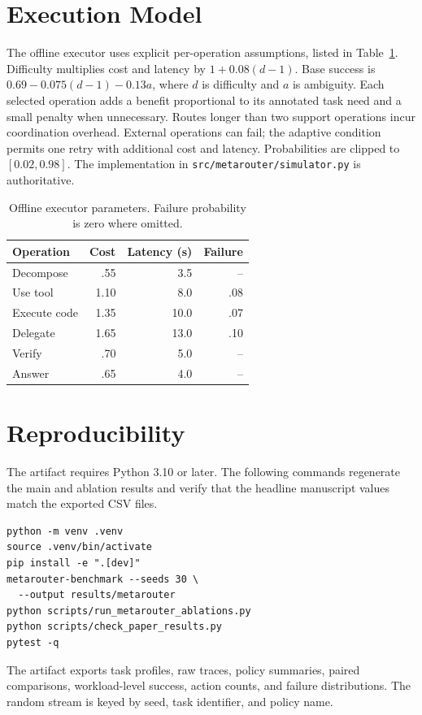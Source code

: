 \documentclass[sigconf]{acmart}
\begin{document}



\appendix

\section{Execution Model}

The offline executor uses explicit per-operation assumptions, listed in Table~\ref{tab:parameters}. Difficulty multiplies cost and latency by $1+0.08(d-1)$. Base success is $0.69-0.075(d-1)-0.13a$, where $d$ is difficulty and $a$ is ambiguity. Each selected operation adds a benefit proportional to its annotated task need and a small penalty when unnecessary. Routes longer than two support operations incur coordination overhead. External operations can fail; the adaptive condition permits one retry with additional cost and latency. Probabilities are clipped to $[0.02,0.98]$. The implementation in \texttt{src/metarouter/simulator.py} is authoritative.

\begin{table}[h]
\caption{Offline executor parameters. Failure probability is zero where omitted.}
\label{tab:parameters}
\small
\begin{tabular}{lrrr}
\toprule
Operation & Cost & Latency (s) & Failure \\
\midrule
Decompose & .55 & 3.5 & -- \\
Use tool & 1.10 & 8.0 & .08 \\
Execute code & 1.35 & 10.0 & .07 \\
Delegate & 1.65 & 13.0 & .10 \\
Verify & .70 & 5.0 & -- \\
Answer & .65 & 4.0 & -- \\
\bottomrule
\end{tabular}
\end{table}

\section{Reproducibility}

The artifact requires Python 3.10 or later. The following commands regenerate the main and ablation results and verify that the headline manuscript values match the exported CSV files.

\begin{verbatim}
python -m venv .venv
source .venv/bin/activate
pip install -e ".[dev]"
metarouter-benchmark --seeds 30 \
  --output results/metarouter
python scripts/run_metarouter_ablations.py
python scripts/check_paper_results.py
pytest -q
\end{verbatim}

The artifact exports task profiles, raw traces, policy summaries, paired comparisons, workload-level success, action counts, and failure distributions. The random stream is keyed by seed, task identifier, and policy name.
\end{document}
